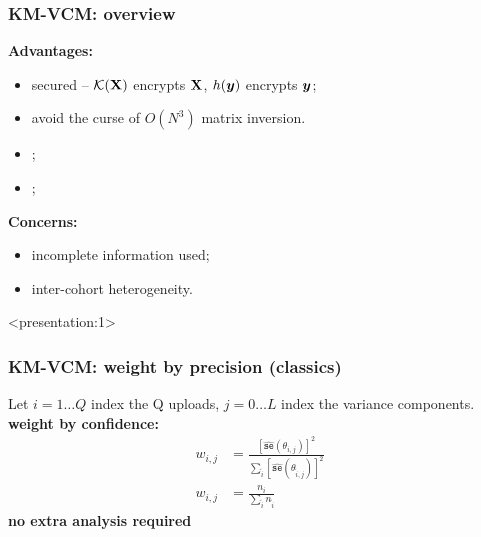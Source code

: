 \documentclass{beamer}
\newcommand{\se}[1]{\hat{\mathtt{se}}\left(#1\right)} %
\newcommand{\ti}{{\tilde{i}}} %
\begin{document}
\begin{frame}\frametitle{\textbf{KM-VCM}: overview}
  \textbf{Advantages:}
  \begin{itemize}
  \item secured -- $\mathcal{K}(\mathbf{X})$ encrypts $\mathbf{X}$, $h({\bm{y}})$
    encrypts ${\bm{y}}$;
  \item avoid the curse of $O(N^3)$ matrix inversion.
  \item {};
  \item {};
  \end{itemize}
  \textbf{Concerns:}
  \begin{itemize}
  \item incomplete information used;
  \item inter-cohort heterogeneity.
  \end{itemize}
\end{frame}
\begin{frame}<presentation:1> %
  \frametitle{KM-VCM: weight by precision (classics)} %
  Let $i = 1 \dots Q$ index the Q uploads, $j = 0 \dots L$ index the
  variance components.\\
  \textbf{weight by confidence:}
  \begin{align}
    w_{i,j} &= \frac{\left[\se{\theta_{i,j}} \right ]^2}
              {\sum_\ti \left[\se{\theta_{\ti,j}} \right ]^2} \\
    w_{i,j} &= \frac{n_i}{\sum_\ti n_\ti}
  \end{align}
  {\color{blue}\textbf{no extra analysis required}}
\end{frame}
\end{document}
